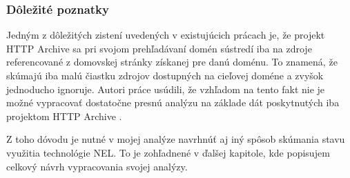 \subsubsection{Dôležité poznatky}

Jedným z dôležitých zistení uvedených v existujúcich prácach je, že projekt HTTP Archive sa pri svojom prehľadávaní domén sústredí iba na zdroje referencované z domovskej stránky získanej pre danú doménu.
To znamená, že skúmajú iba malú čiastku zdrojov dostupných na cieľovej doméne a zvyšok jednoducho ignoruje.
Autori práce usúdili, že vzhľadom na tento fakt nie je možné vypracovať dostatočne presnú analýzu na základe dát poskytnutých iba projektom HTTP Archive \cite{nel-http-archive}.

Z toho dóvodu je nutné v mojej analýze navrhnúť aj iný spôsob skúmania stavu využitia technológie NEL.
To je zohľadnené v ďalšej kapitole, kde popisujem celkový návrh vypracovania svojej analýzy.
